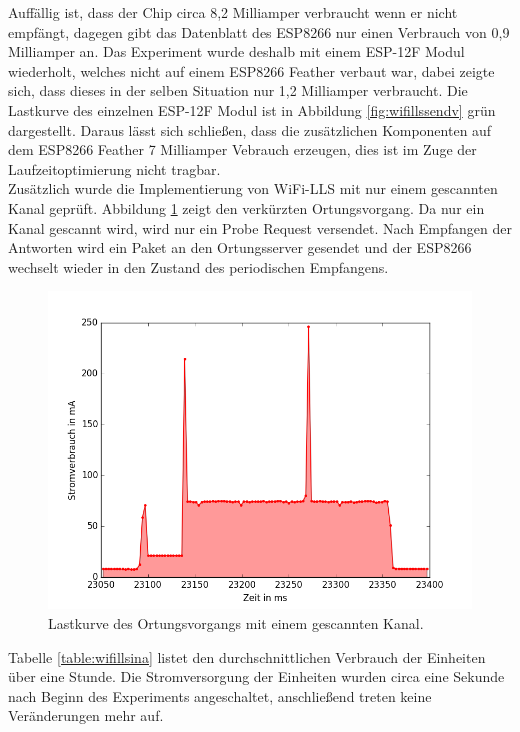 Auffällig ist, dass der Chip circa 8,2 Milliamper verbraucht wenn er nicht empfängt, dagegen gibt das Datenblatt des ESP8266 nur einen Verbrauch von 0,9 Milliamper an.
Das Experiment wurde deshalb mit einem ESP-12F Modul wiederholt, welches nicht auf einem ESP8266 Feather verbaut war, dabei zeigte sich, dass dieses in der selben Situation nur 1,2 Milliamper verbraucht.
Die Lastkurve des einzelnen ESP-12F Modul ist in Abbildung \ref{fig:wifillssendv} grün dargestellt.
Daraus lässt sich schließen, dass die zusätzlichen Komponenten auf dem ESP8266 Feather 7 Milliamper Vebrauch erzeugen, dies ist im Zuge der Laufzeitoptimierung nicht tragbar.\\
Zusätzlich wurde die Implementierung von WiFi-LLS mit nur einem gescannten Kanal geprüft.
Abbildung \ref{fig:wifills1chsend} zeigt den verkürzten Ortungsvorgang.
Da nur ein Kanal gescannt wird, wird nur ein Probe Request versendet.
Nach Empfangen der Antworten wird ein Paket an den Ortungsserver gesendet und der ESP8266 wechselt wieder in den Zustand des periodischen Empfangens.\\

\begin{figure}[h!]
  \centering
	\includegraphics[width=\textwidth]{plots/wifills1chsend.png}
  \caption{Lastkurve des Ortungsvorgangs mit einem gescannten Kanal.}
  \label{fig:wifills1chsend}
\end{figure}

Tabelle \ref{table:wifillsina} listet den durchschnittlichen Verbrauch der Einheiten über eine Stunde.
Die Stromversorgung der Einheiten wurden circa eine Sekunde nach Beginn des Experiments angeschaltet, anschließend treten keine Veränderungen mehr auf.



